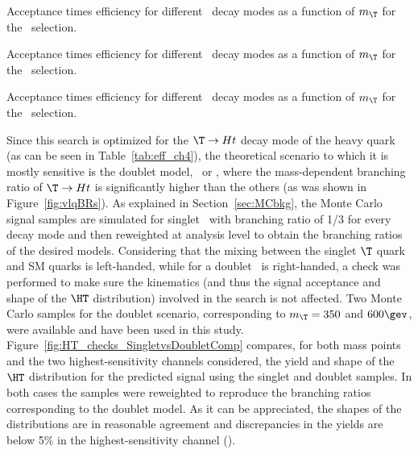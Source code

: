\begin{table}[h!tb]
\begin{center}%

\caption{Acceptance times efficiency for different \TTbar\ decay modes as a function of $m_{\T}$ for the \chii\ selection.}
\label{tab:eff_ch2}
\end{center}
\begin{center}%

\caption{Acceptance times efficiency for different \TTbar\ decay modes as a function of $m_{\T}$ for the \chiii\ selection.}
\label{tab:eff_ch3}
\end{center}
\begin{center}%

\caption{Acceptance times efficiency for different \TTbar\ decay modes as a function of $m_{\T}$ for the \chiv\ selection.}
\label{tab:eff_ch4}
\end{center}
\end{table}

Since this search is optimized for the
$\T \to Ht$ decay mode of the heavy quark (as can be seen in
Table~\ref{tab:eff_ch4}), the theoretical
scenario to which it is mostly sensitive is the doublet
model, \TB\ or \XT,
where the mass-dependent branching ratio of $\T \to Ht$ is
significantly higher than the others (as was shown in Figure~\ref{fig:vlqBRs}).
As explained in Section~\ref{sec:MCbkg}, the Monte Carlo signal samples
are simulated for singlet \T\ with branching ratio of 1/3 for
every decay mode and then reweighted at analysis level to obtain the
branching ratios of the desired models. 
Considering that the mixing between the singlet $\T$ quark and SM
quarks is left-handed, while for a doublet \T\ is right-handed,
a check was performed to make sure the kinematics (and thus the signal acceptance and shape
of the $\HT$ distribution)
involved in the search is not affected.
Two Monte Carlo samples for the doublet scenario, 
corresponding to $m_{\T}=350$ and $600\gev$, were available and
have been used in this study. 
Figure~\ref{fig:HT_checks_SingletvsDoubletComp} compares, for both mass
points and the two highest-sensitivity channels considered, the yield 
and shape of the $\HT$ distribution for the 
predicted signal using the singlet and doublet samples. 
In both cases the samples were reweighted to reproduce
the branching ratios corresponding to the doublet model. 
As it can be appreciated, the shapes of the distributions
are in reasonable agreement and discrepancies in the yields 
are below 5\% in the highest-sensitivity channel (\chiv).

